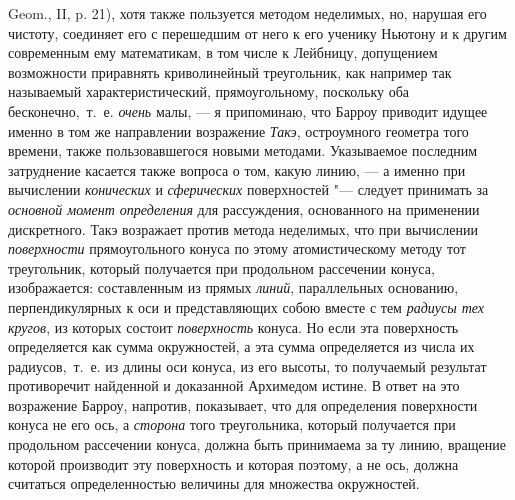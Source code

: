 {Geom., II, p. 21), хотя также пользуется методом неделимых, но, нарушая его
чистоту, соединяет его с перешедшим от него к его ученику Ньютону и к
другим современным ему математикам, в том числе к Лейбницу, допущением
возможности приравнять криволинейный треугольник, как например так
называемый характеристический, прямоугольному, поскольку оба
бесконечно,~т.~е. {\em очень} малы, — я припоминаю, что
Барроу приводит идущее именно в том же направлении возражение
{\em Такэ}, остроумного геометра того времени, также
пользовавшегося новыми методами. Указываемое последним затруднение касается
также вопроса о том, какую линию, — а именно при вычислении
{\em конических} и
{\em сферических} поверхностей "--- следует принимать за
{\em основной момент определения} для рассуждения,
основанного на применении дискретного. Такэ возражает против метода
неделимых, что при вычислении {\em поверхности}
прямоугольного конуса по этому атомистическому методу тот треугольник,
который получается при продольном рассечении конуса, изображается:
составленным из прямых {\em линий}, параллельных
основанию, перпендикулярных к оси и представляющих собою вместе с тем
{\em радиусы тех кругов}, из которых состоит
{\em поверхность }конуса. Но если эта поверхность
определяется как сумма окружностей, а эта сумма определяется из числа их
радиусов,~т.~е. из длины оси конуса, из его высоты, то получаемый результат
противоречит найденной и доказанной Архимедом истине. В ответ на это
возражение Барроу, напротив, показывает, что для определения поверхности
конуса не его ось, а {\em сторона} того треугольника,
который получается при продольном рассечении конуса, должна быть принимаема
за ту линию, вращение которой производит эту поверхность и которая поэтому,
а не ось, должна считаться определенностью величины для множества
окружностей.

}
